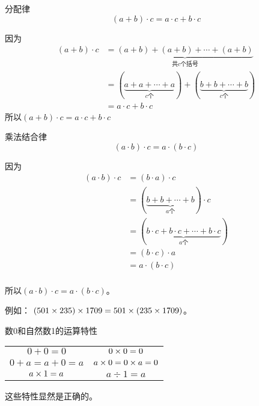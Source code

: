 \begin{blk}{分配律}
	\[(a+b)\cdot c=a\cdot c+b\cdot c \]
\end{blk}
\begin{note}
	因为
	\begin{align*}
	(a+b)\cdot c&=\underbrace{(a+b)+(a+b)+\cdots+(a+b)}_{\text{共$c$个括号}} \tag{乘法的意义}\\
	&=(\underbrace{a+a+\cdots+a}_{c\text{个}})+(\underbrace{b+b+\cdots +b}_{c\text{个}})\tag{加法结合律与交换律}\\
	&=a\cdot c+b\cdot c   \tag{乘法的意义} 
	\end{align*}
	所以$(a+b)\cdot c=a\cdot c+b\cdot c $
\end{note}


\begin{blk}{乘法结合律}
	\[(a\cdot b)\cdot c=a\cdot (b\cdot c) \]
\end{blk}

\begin{note}
	因为
	\begin{align*}
	(a\cdot b)\cdot c&=(b\cdot a)\cdot c \tag{乘法交换律}\\
	&=(\underbrace{b+b+\cdots +b}_{a\text{个}})\cdot c \tag{乘法的意义}\\
	&=(\underbrace{b\cdot c+b\cdot c+\cdots +b\cdot c}_{a\text{个}})  \tag{分配律} \\
	&=(b\cdot c)\cdot a \tag{乘法的意义}\\
	&=a\cdot (b\cdot c) \tag{乘法交换律}\\
	\end{align*}
	
	所以$(a\cdot b)\cdot c=a\cdot (b\cdot c)$。
	
	例如：  $(501\times   235) \times 1709=501\times    (235 \times 1709)$。    
\end{note}

\begin{blk}{数0和自然数1的运算特性}
	\begin{center}
		\begin{tabular}{cc}
			$0+0=0$   &   $0\times 0=0$\\
			$0+a=a+0=a$   &   $a\times 0=0\times a=0$\\
			$a\times 1=a$   &   $a\div 1=a$\\       
		\end{tabular}     
	\end{center}
\end{blk}

这些特性显然是正确的。

